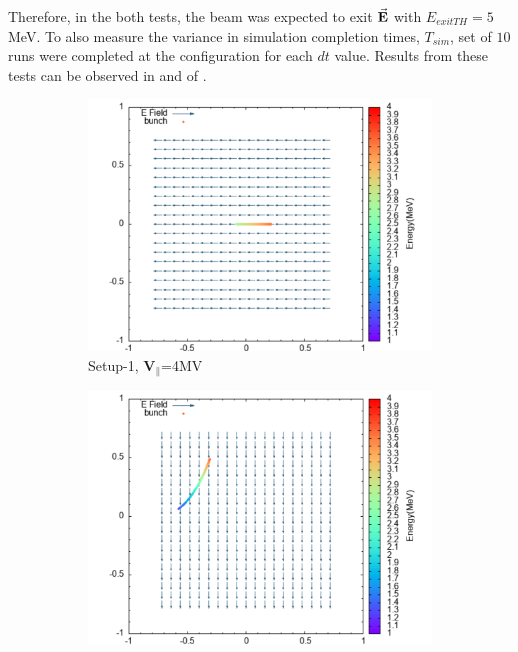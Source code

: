 \documentclass[a4paper,oneside,12pt]{report}
\numberwithin{equation}{chapter}
\begin{document}
{\vspace{-15pt}
Therefore, in the both tests, the beam was expected to exit $\vec{\textbf{E}}$ with $E_{exitTH} = 5$ MeV. 
To also measure the variance in simulation completion times, $T_{sim}$, set of $10$ runs were completed at the configuration for each $dt$ value.
Results from these tests can be observed in  and  of .
\iffalse \begin{figure}[H]
    \centering
    \begin{subfigure}{0.9\textwidth}
        \centering
        \includegraphics[width=\linewidth]{./figures/rhodoSim/statE_par.png}
        \caption*{Setup-1, $\textbf{V}_{\parallel}$=4MV}
    \end{subfigure}
    \begin{subfigure}{0.9\textwidth}
        \centering
        \includegraphics[width=\linewidth]{./figures/rhodoSim/statE_perp.png}

\end{subfigure}
\end{figure}}
\end{document}
